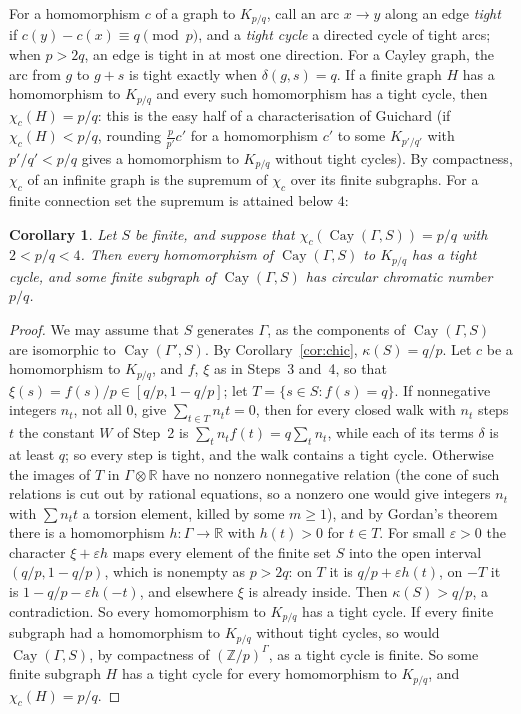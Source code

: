 \documentclass[11pt,a4paper]{amsart}
\newtheorem{corollary}[theorem]{Corollary}
\theoremstyle{definition}
\newcommand{\R}{\mathbb{R}}
\newcommand{\Z}{\mathbb{Z}}
\newcommand{\Cay}{\operatorname{Cay}}
\begin{document}
For a homomorphism $c$ of a graph to $K_{p/q}$, call an arc $x\to y$ along an edge \emph{tight} if
$c(y)-c(x)\equiv q\pmod p$, and a \emph{tight cycle} a directed cycle of tight arcs; when $p>2q$, an edge is tight in
at most one direction. For a Cayley graph, the arc from $g$ to $g+s$ is tight exactly when $\delta(g,s)=q$. If a finite graph $H$ has a homomorphism to
$K_{p/q}$ and every such homomorphism has a tight cycle, then $\chi_c(H)=p/q$: this is the easy half of a
characterisation of Guichard \cite{Guichard} (if $\chi_c(H)<p/q$, rounding $\frac p{p'}c'$ for a homomorphism $c'$
to some $K_{p'/q'}$ with $p'/q'<p/q$ gives a homomorphism to $K_{p/q}$ without tight cycles). By compactness,
$\chi_c$ of an infinite graph is the supremum of $\chi_c$ over its finite subgraphs. For a finite connection set the
supremum is attained below $4$:

\begin{corollary}\label{cor:finite}
Let $S$ be finite, and suppose that $\chi_c(\Cay(\Gamma,S))=p/q$ with $2<p/q<4$. Then every homomorphism of
$\Cay(\Gamma,S)$ to $K_{p/q}$ has a tight cycle, and some finite subgraph of $\Cay(\Gamma,S)$ has circular chromatic
number $p/q$.
\end{corollary}

\begin{proof}
We may assume that $S$ generates $\Gamma$, as the components of $\Cay(\Gamma,S)$ are isomorphic to
$\Cay(\Gamma',S)$. By Corollary~\ref{cor:chic}, $\kappa(S)=q/p$. Let $c$ be a homomorphism to $K_{p/q}$, and $f$,
$\xi$ as in Steps~3 and~4, so that $\xi(s)=f(s)/p\in[q/p,1-q/p]$; let $T=\{s\in S:f(s)=q\}$. If nonnegative
integers $n_t$, not all $0$, give $\sum_{t\in T}n_tt=0$, then for every closed walk with $n_t$ steps $t$ the constant
$W$ of Step~2 is $\sum_tn_tf(t)=q\sum_tn_t$, while each of its terms $\delta$ is at least $q$; so every step is
tight, and the walk contains a tight cycle. Otherwise the images of $T$ in $\Gamma\otimes\R$ have no nonzero
nonnegative relation (the cone of such relations is cut out by rational equations, so a nonzero one would give
integers $n_t$ with $\sum n_tt$ a torsion element, killed by some $m\ge1$), and by Gordan's theorem there is a
homomorphism $h:\Gamma\to\R$ with $h(t)>0$ for $t\in T$. For small $\varepsilon>0$ the character
$\xi+\varepsilon h$ maps every element of the finite set $S$ into the open interval $(q/p,1-q/p)$, which is nonempty
as $p>2q$: on $T$ it is $q/p+\varepsilon h(t)$, on $-T$ it is $1-q/p-\varepsilon h(-t)$, and elsewhere $\xi$ is
already inside. Then $\kappa(S)>q/p$, a contradiction. So every homomorphism to $K_{p/q}$ has a tight cycle. If every
finite subgraph had a homomorphism to $K_{p/q}$ without tight cycles, so would $\Cay(\Gamma,S)$, by compactness of
$(\Z/p)^\Gamma$, as a tight cycle is finite. So some finite subgraph $H$ has a tight cycle for every homomorphism to
$K_{p/q}$, and $\chi_c(H)=p/q$.
\end{proof}
\end{document}
